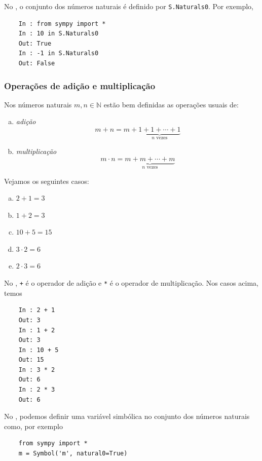 \ifispython
\begin{obs}
  No \python, o conjunto dos números naturais é definido por \lstinline!S.Naturals0!. Por exemplo,
  \begin{lstlisting}
    In : from sympy import *
    In : 10 in S.Naturals0
    Out: True
    In : -1 in S.Naturals0
    Out: False
  \end{lstlisting}
\end{obs}
\fi

\subsubsection{Operações de adição e multiplicação}

Nos números naturais $m,n\in\mathbb{N}$ estão bem definidas as operações usuais de:
\begin{enumerate}[a)]
\item \emph{adição}
  \begin{equation}
    m+n = m + \underbrace{1 + 1 + \cdots + 1}_{n\text{ vezes}}
  \end{equation}
\item \emph{multiplicação}
  \begin{equation}
    m\cdot n = \underbrace{m + m + \cdots + m}_{n\text{ vezes}}
  \end{equation}
\end{enumerate}

\begin{ex}
  Vejamos os seguintes casos:
  \begin{enumerate}[a)]
  \item $2 + 1 = 3$
  \item $1 + 2 = 3$
  \item $10 + 5 = 15$
  \item $3\cdot 2 = 6$
  \item $2\cdot 3 = 6$
  \end{enumerate}

  \ifispython
  No \python, \lstinline!+! é o operador de adição e \lstinline!*! é o operador de multiplicação. Nos casos acima, temos
  \begin{lstlisting}
    In : 2 + 1
    Out: 3
    In : 1 + 2
    Out: 3
    In : 10 + 5
    Out: 15
    In : 3 * 2
    Out: 6
    In : 2 * 3
    Out: 6
  \end{lstlisting}
  \fi
\end{ex}

\ifispython
\begin{obs}
  No \python, podemos definir uma variável simbólica no conjunto dos números naturais como, por exemplo
  \begin{lstlisting}
    from sympy import *
    m = Symbol('m', natural0=True)
  \end{lstlisting}
\end{obs}
\fi

